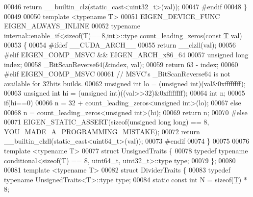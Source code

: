 \begin{DoxyCode}
00046     \textcolor{keywordflow}{return} \_\_builtin\_clz(static\_cast<uint32\_t>(val));
00047 \textcolor{preprocessor}{#endif}
00048   \}
00049 
00050   \textcolor{keyword}{template} <\textcolor{keyword}{typename} T>
00051   EIGEN\_DEVICE\_FUNC EIGEN\_ALWAYS\_INLINE
00052   \textcolor{keyword}{typename} internal::enable\_if<sizeof(T)==8,int>::type count\_leading\_zeros(\textcolor{keyword}{const} 
      \hyperlink{group___sparse_core___module_class_eigen_1_1_triplet}{T} val)
00053   \{
00054 \textcolor{preprocessor}{#ifdef \_\_CUDA\_ARCH\_\_}
00055     \textcolor{keywordflow}{return} \_\_clzll(val);
00056 \textcolor{preprocessor}{#elif EIGEN\_COMP\_MSVC && EIGEN\_ARCH\_x86\_64}
00057     \textcolor{keywordtype}{unsigned} \textcolor{keywordtype}{long} index;
00058     \_BitScanReverse64(&index, val);
00059     \textcolor{keywordflow}{return} 63 - index;
00060 \textcolor{preprocessor}{#elif EIGEN\_COMP\_MSVC}
00061     \textcolor{comment}{// MSVC's \_BitScanReverse64 is not available for 32bits builds.}
00062     \textcolor{keywordtype}{unsigned} \textcolor{keywordtype}{int} lo = (\textcolor{keywordtype}{unsigned} int)(val&0xffffffff);
00063     \textcolor{keywordtype}{unsigned} \textcolor{keywordtype}{int} hi = (\textcolor{keywordtype}{unsigned} int)((val>>32)&0xffffffff);
00064     \textcolor{keywordtype}{int} n;
00065     \textcolor{keywordflow}{if}(hi==0)
00066       n = 32 + count\_leading\_zeros<unsigned int>(lo);
00067     \textcolor{keywordflow}{else}
00068       n = count\_leading\_zeros<unsigned int>(hi);
00069     \textcolor{keywordflow}{return} n;
00070 \textcolor{preprocessor}{#else}
00071     EIGEN\_STATIC\_ASSERT(\textcolor{keyword}{sizeof}(\textcolor{keywordtype}{unsigned} \textcolor{keywordtype}{long} \textcolor{keywordtype}{long}) == 8, YOU\_MADE\_A\_PROGRAMMING\_MISTAKE);
00072     \textcolor{keywordflow}{return} \_\_builtin\_clzll(static\_cast<uint64\_t>(val));
00073 \textcolor{preprocessor}{#endif}
00074   \}
00075 
00076   \textcolor{keyword}{template} <\textcolor{keyword}{typename} T>
00077   \textcolor{keyword}{struct }UnsignedTraits \{
00078     \textcolor{keyword}{typedef} \textcolor{keyword}{typename} conditional<sizeof(T) == 8, uint64\_t, uint32\_t>::type type;
00079   \};
00080 
00081   \textcolor{keyword}{template} <\textcolor{keyword}{typename} T>
00082   \textcolor{keyword}{struct }DividerTraits \{
00083     \textcolor{keyword}{typedef} \textcolor{keyword}{typename} UnsignedTraits<T>::type type;
00084     \textcolor{keyword}{static} \textcolor{keyword}{const} \textcolor{keywordtype}{int} N = \textcolor{keyword}{sizeof}(\hyperlink{group___sparse_core___module_class_eigen_1_1_triplet}{T}) * 8;

\end{DoxyCode}
